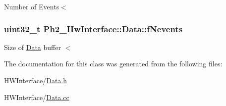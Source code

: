 Number of Events$<$ \hypertarget{class_ph2___hw_interface_1_1_data_ac27abb30ceb327ce0fc4245caaf0b3d5}{
\subsubsection[{f\-Nevents}]{\setlength{\rightskip}{0pt plus 5cm}uint32\-\_\-t Ph2\-\_\-\-Hw\-Interface\-::\-Data\-::f\-Nevents\hspace{0.3cm}{\ttfamily [private]}}}\label{class_ph2___hw_interface_1_1_data_ac27abb30ceb327ce0fc4245caaf0b3d5}
Size of \hyperlink{class_ph2___hw_interface_1_1_data}{Data} buffer $<$ 

The documentation for this class was generated from the following files\-:\begin{DoxyCompactItemize}
\item 
H\-W\-Interface/\hyperlink{_data_8h}{Data.\-h}\item 
H\-W\-Interface/\hyperlink{_data_8cc}{Data.\-cc}\end{DoxyCompactItemize}
